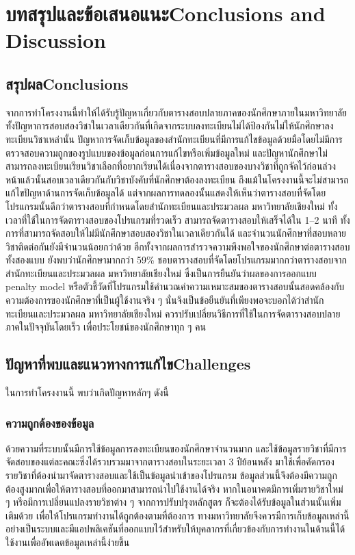 \chapter{\ifcpe บทสรุปและข้อเสนอแนะ\else Conclusions and Discussion\fi}

\section{\ifcpe สรุปผล\else Conclusions\fi}

จากการทำโครงงานนี้ทำให้ได้รับรู้ปัญหาเกี่ยวกับตารางสอบปลายภาคของนักศึกษาภายในมหาวิทยาลัย
ทั้งปัญหาการสอบสองวิชาในเวลาเดียวกันที่เกิดจากระบบลงทะเบียนไม่ได้ป้องกันไม่ให้นักศึกษาลงทะเบียนวิชาเหล่านั้น
ปัญหาการจัดเก็บข้อมูลของสำนักทะเบียนที่มีการแก้ไขข้อมูลด้วยมือโดยไม่มีการตรวจสอบความถูกของรูปแบบของข้อมูลก่อนการแก้ไขหรือเพิ่มข้อมูลใหม่
และปัญหานักศึกษาไม่สามารถลงทะเบียนเรียนวิชาเลือกที่อยากเรียนได้เนื่องจากตารางสอบของบางวิชาที่ถูกจัดไว้ก่อนล่วงหน้าแล้วนั้นสอบเวลาเดียวกันกับวิชาบังคับที่นักศึกษาต้องลงทะเบียน
ถึงแม้ในโครงงานนี้จะไม่สามารถแก้ไขปัญหาด้านการจัดเก็บข้อมูลได้ แต่จากผลการทดลองนั้นแสดงให้เห็นว่าตารางสอบที่จัดโดยโปรแกรมนั้นดีกว่าตารางสอบที่กำหนดโดยสำนักทะเบียนและประมวลผล มหาวิทยาลัยเชียงใหม่
ทั้งเวลาที่ใช้ในการจัดตารางสอบของโปรแกรมที่รวดเร็ว สามารถจัดตารางสอบให้เสร็จได้ใน 1--2 นาที ทั้งการที่สามารถจัดสอบให้ไม่มีนักศึกษาสอบสองวิชาในเวลาเดียวกันได้
และจำนวนนักศึกษาที่สอบหลายวิชาติดต่อกันยังมีจำนวนน้อยกว่าด้วย อีกทั้งจากผลการสำรวจความพึงพอใจของนักศึกษาต่อตารางสอบทั้งสองแบบ ยังพบว่านักศึกษามากกว่า 59\%
ชอบตารางสอบที่จัดโดยโปรแกรมมากกว่าตารางสอบจากสำนักทะเบียนและประมวลผล มหาวิทยาลัยเชียงใหม่ ซึ่งเป็นการยืนยันว่าผลของการออกแบบ penalty model
หรือตัวชี้วัดที่โปรแกรมใช้คำนวณค่าความเหมาะสมของตารางสอบนั้นสอดคล้องกับความต้องการของนักศึกษาที่เป็นผู้ใช้งานจริง ๆ นั่นจึงเป็นข้อยืนยันที่เพียงพอจะบอกได้ว่าสำนักทะเบียนและประมวลผล มหาวิทยาลัยเชียงใหม่
ควรปรับเปลี่ยนวิธีการที่ใช้ในการจัดตารางสอบปลายภาคในปัจจุบันโดยเร็ว เพื่อประโยชน์ของนักศึกษาทุก ๆ คน

\section{\ifcpe ปัญหาที่พบและแนวทางการแก้ไข\else Challenges\fi}

ในการทำโครงงานนี้ พบว่าเกิดปัญหาหลักๆ ดังนี้
\subsection{ความถูกต้องของข้อมูล}
ด้วยความที่ระบบนั้นมีการใช้ข้อมูลการลงทะเบียนของนักศึกษาจำนวนมาก และใช้ข้อมูลรายวิชาที่มีการจัดสอบของแต่ละคณะซึ่งได้รวบรวมมาจากตารางสอบในระยะเวลา 3 ปีย้อนหลัง
มาใช้เพื่อคัดกรองรายวิชาที่ต้องนำมาจัดตารางสอบและใช้เป็นข้อมูลนำเข้าของโปรแกรม 
ข้อมูลส่วนนี้จึงต้องมีความถูกต้องสูงมากเพื่อให้ตารางสอบที่ออกมาสามารถนำไปใช้งานได้จริง 
หากในอนาคตมีการเพิ่มรายวิชาใหม่ ๆ หรือมีการเปลี่ยนแปลงรายวิชาต่าง ๆ จากการปรับปรุงหลักสูตร ก็จะต้องได้รับข้อมูลในส่วนนั้นเพิ่มเติมด้วย 
เพื่อให้โปรแกรมทำงานได้ถูกต้องตามที่ต้องการ ทางมหาวิทยาลัยจึงควรมีการเก็บข้อมูลเหล่านี้อย่างเป็นระบบและมีแอปพลิเคชันที่ออกแบบไว้สำหรับให้บุคลากรที่เกี่ยวข้องกับการทำงานในด้านนี้ได้ใช้งานเพื่ออัพเดตข้อมูลเหล่านี้ง่ายขึ้น

